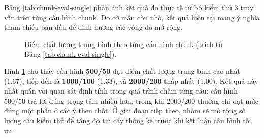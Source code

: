 \documentclass[10pt, conference, a4paper, compsocconf]{IEEEtran}
\begin{document}
\begin{table}[!htb]
\renewcommand{\arraystretch}{1.3}
\caption{Bảng 1. Kết quả khảo sát định lượng theo cấu hình chunk (3 truy vấn kiểm thử)}
\label{tab:chunk-eval-single}
\centering
\normalsize
{}
\end{table}

Bảng \ref{tab:chunk-eval-single} phản ánh kết quả đo thực tế từ bộ kiểm thử 3 truy vấn trên từng cấu hình chunk. Do cỡ mẫu còn nhỏ, kết quả hiện tại mang ý nghĩa tham chiếu ban đầu để định hướng các vòng đo mở rộng.

\begin{figure}[!htb]
\centering
{}
\caption{Điểm chất lượng trung bình theo từng cấu hình chunk (trích từ Bảng \ref{tab:chunk-eval-single}).}
\label{fig:chunk-impact}
\end{figure}

Hình \ref{fig:chunk-impact} cho thấy cấu hình \textbf{500/50} đạt điểm chất lượng trung bình cao nhất (1.67), tiếp đến là \textbf{1000/100} (1.33), và \textbf{2000/200} thấp nhất (1.00). Kết quả này nhất quán với quan sát định tính trong quá trình chấm từng câu: cấu hình 500/50 trả lời đúng trọng tâm nhiều hơn, trong khi 2000/200 thường chỉ đạt mức đúng một phần ở các ý then chốt. Ở giai đoạn tiếp theo, nhóm sẽ mở rộng số lượng câu kiểm thử để tăng độ tin cậy thống kê trước khi kết luận cấu hình tối ưu.
\end{document}
